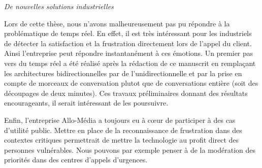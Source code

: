 \vspace{1cm}

\textit{De nouvelles solutions industrielles}

Lors de cette thèse, nous n'avons malheureusement pas pu répondre à la problématique de temps réel. En effet, il est très intéressant pour les industriels de détecter la satisfaction et la frustration directement lors de l'appel du client. Ainsi l'entreprise peut répondre instantanément à ces émotions. Un premier pas vers du temps réel a été réalisé après la rédaction de ce manuscrit en remplaçant les architectures bidirectionnelles par de l'unidirectionnelle et par la prise en compte de morceaux de conversation plutot que de conversations entière (soit des découpages de deux minutes). Ces travaux préliminaires donnant des résultats encourageants, il serait intéressant de les poursuivre.

Enfin, l'entreprise Allo-Média a toujours eu à cœur de participer à des cas d'utilité public. Mettre en place de la reconnaissance de frustration dans des contextes critiques permettrait de mettre la technologie au profit direct des personnes vulnérables. Nous pouvons par exemple penser à de la modération des priorités dans des centres d'appels d'urgences.
